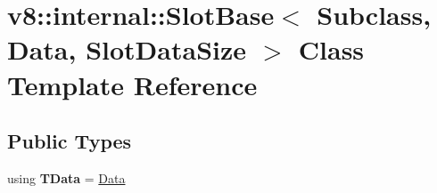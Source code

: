 \hypertarget{classv8_1_1internal_1_1SlotBase}{}\section{v8\+:\+:internal\+:\+:Slot\+Base$<$ Subclass, Data, Slot\+Data\+Size $>$ Class Template Reference}
\label{classv8_1_1internal_1_1SlotBase}
\subsection*{Public Types}
\begin{DoxyCompactItemize}
\item 
\mbox{\label{classv8_1_1internal_1_1SlotBase_a427ac7bf42c9b36212617163f391f985}} 
using {\bfseries T\+Data} = \mbox{\hyperlink{classv8_1_1Data}{Data}}
\end{DoxyCompactItemize}
